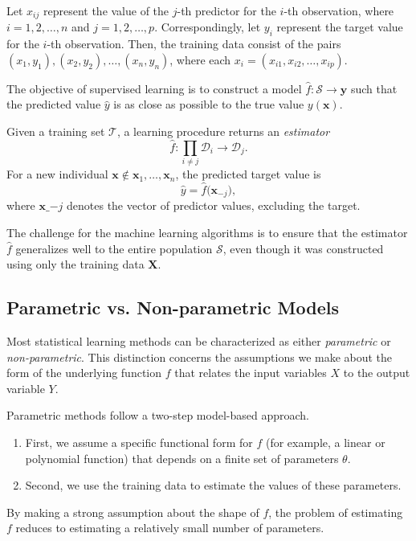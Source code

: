 Let $x_{ij}$ represent the value of the $j$-th predictor for the $i$-th observation, where $i = 1, 2, \ldots, n$ and $j = 1, 2, \ldots, p$. Correspondingly, let $y_i$ represent the target value for the $i$-th observation. Then, the training data consist of the pairs ${(x_1, y_1), (x_2, y_2), \ldots, (x_n, y_n)}$, where each $x_i = (x_{i1}, x_{i2}, \ldots, x_{ip})$.

The objective of supervised learning is to construct a model $\hat{f}: \mathcal{S} \rightarrow \mathbf{y}$ such that the predicted value $\hat{y}$ is as close as possible to the true value $y(\mathbf{x})$.

\begin{definition}
Given a training set $\mathcal{T}$, a learning procedure returns an \emph{estimator}
\[
\hat{f}:\prod_{i \ne j} \mathcal{D}_{i} \longrightarrow \mathcal{D}_{j}.
\]
For a new individual $\mathbf{x} \notin {\mathbf{x}_{1}, \dots, \mathbf{x}_{n}}$, the predicted target value is
\[
\hat{y} = \hat{f}\bigl(\mathbf{x}_{-j}\bigr),
\]
where $\mathbf{x}\_{-j}$ denotes the vector of predictor values, excluding the target.
\end{definition}

The challenge for the machine learning algorithms is to ensure that the estimator $\hat{f}$ generalizes well to the entire population $\mathcal{S}$, even though it was constructed using only the training data $\mathbf{X}$.


\subsection{Parametric vs. Non-parametric Models}
\label{sec:parametric_vs_nonparametric}

Most statistical learning methods can be characterized as either \emph{parametric} or \emph{non-parametric}. 
This distinction concerns the assumptions we make about the form of the underlying function $f$ that relates the input variables $X$ to the output variable $Y$.

Parametric methods follow a two-step model-based approach. 
\begin{enumerate}
    \item First, we assume a specific functional form for $f$ (for example, a linear or polynomial function) that depends on a finite set of parameters $\theta$.
    \item Second, we use the training data to estimate the values of these parameters.
\end{enumerate}
By making a strong assumption about the shape of $f$, the problem of estimating $f$ reduces to estimating a relatively small number of parameters. 

